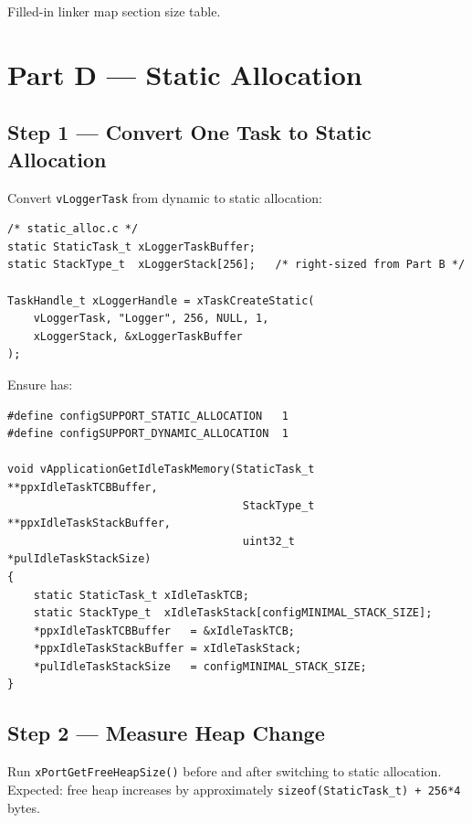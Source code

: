 \documentclass[11pt, a4paper]{article}
\begin{document}
\begin{checkpointbox}[~C]
  Filled-in linker map section size table.
\end{checkpointbox}

\section{Part D --- Static Allocation}

\subsection{Step 1 --- Convert One Task to Static Allocation}

Convert \texttt{vLoggerTask} from dynamic to static allocation:

\begin{lstlisting}[style=cstyle]
/* static_alloc.c */
static StaticTask_t xLoggerTaskBuffer;
static StackType_t  xLoggerStack[256];   /* right-sized from Part B */

TaskHandle_t xLoggerHandle = xTaskCreateStatic(
    vLoggerTask, "Logger", 256, NULL, 1,
    xLoggerStack, &xLoggerTaskBuffer
);
\end{lstlisting}

Ensure  has:

\begin{lstlisting}[style=cstyle]
#define configSUPPORT_STATIC_ALLOCATION   1
#define configSUPPORT_DYNAMIC_ALLOCATION  1

void vApplicationGetIdleTaskMemory(StaticTask_t **ppxIdleTaskTCBBuffer,
                                    StackType_t  **ppxIdleTaskStackBuffer,
                                    uint32_t      *pulIdleTaskStackSize)
{
    static StaticTask_t xIdleTaskTCB;
    static StackType_t  xIdleTaskStack[configMINIMAL_STACK_SIZE];
    *ppxIdleTaskTCBBuffer   = &xIdleTaskTCB;
    *ppxIdleTaskStackBuffer = xIdleTaskStack;
    *pulIdleTaskStackSize   = configMINIMAL_STACK_SIZE;
}
\end{lstlisting}

\subsection{Step 2 --- Measure Heap Change}

Run \texttt{xPortGetFreeHeapSize()} before and after switching to static allocation.
Expected: free heap increases by approximately
\texttt{sizeof(StaticTask\_t) + 256*4} bytes.
\end{document}
